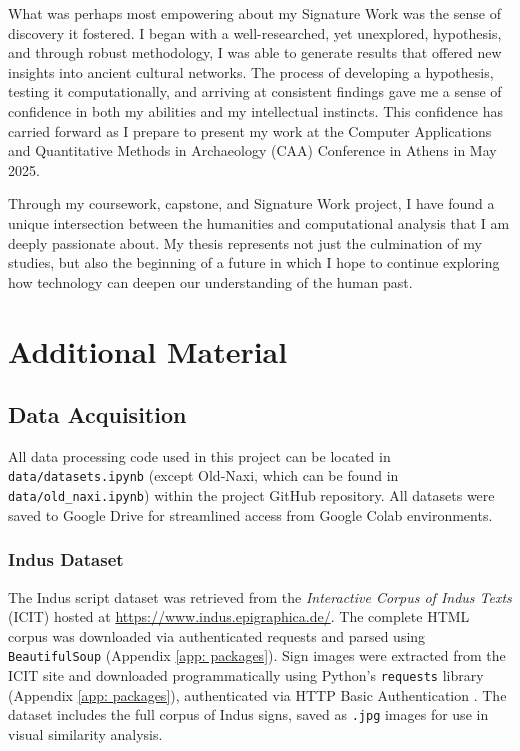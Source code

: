 \documentclass[11pt,a4paper,oneside]{report}
\begin{document}
What was perhaps most empowering about my Signature Work was the sense of discovery it fostered. I began with a well-researched, yet unexplored, hypothesis, and through robust methodology, I was able to generate results that offered new insights into ancient cultural networks. The process of developing a hypothesis, testing it computationally, and arriving at consistent findings gave me a sense of confidence in both my abilities and my intellectual instincts. This confidence has carried forward as I prepare to present my work at the Computer Applications and Quantitative Methods in Archaeology (CAA) Conference in Athens in May 2025.

Through my coursework, capstone, and Signature Work project, I have found a unique intersection between the humanities and computational analysis that I am deeply passionate about. My thesis represents not just the culmination of my studies, but also the beginning of a future in which I hope to continue exploring how technology can deepen our understanding of the human past.

\appendix
\chapter{Additional Material}

\section{Data Acquisition}
\label{app: data-acq}
\noindent\hspace{1cm}
All data processing code used in this project can be located in \texttt{data/datasets.ipynb} (except Old-Naxi, which can be found in \texttt{data/old\_naxi.ipynb}) within the project GitHub repository. All datasets were saved to Google Drive for streamlined access from Google Colab environments.

\subsection*{Indus Dataset}
The Indus script dataset was retrieved from the \textit{Interactive Corpus of Indus Texts} (ICIT) \cite{wells_interactive_2024} hosted at \url{https://www.indus.epigraphica.de/}. The complete HTML corpus was downloaded via authenticated requests and parsed using \texttt{BeautifulSoup} (Appendix \ref{app: packages}). Sign images were extracted from the ICIT site and downloaded programmatically using Python’s \texttt{requests} library (Appendix \ref{app: packages}), authenticated via HTTP Basic Authentication . The dataset includes the full corpus of Indus signs, saved as \texttt{.jpg} images for use in visual similarity analysis.
\end{document}
